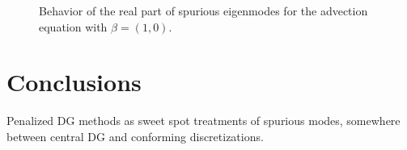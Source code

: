\documentclass[10pt]{article}
\newcommand{\note}[1]{{\color{blue}#1}}
\begin{document}
\begin{figure}
\centering
{}
\hspace{.5em}
\hspace{.5em}
\caption{Behavior of the real part of spurious eigenmodes for the advection equation with $\beta = (1,0)$. }
\label{fig:trackModesAdvecU}
\end{figure}

\section{Conclusions}

\note{Penalized DG methods as sweet spot treatments of spurious modes, somewhere between central DG and conforming discretizations.}



\end{document}
